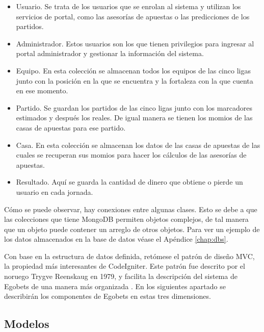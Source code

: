 	\begin{itemize}
		\item Usuario. Se trata de los usuarios que se enrolan al sistema y utilizan los servicios de portal, como las asesorías de apuestas o las predicciones de los partidos.
		\item Administrador. Estos usuarios son los que tienen privilegios para ingresar al portal administrador y gestionar la información del sistema.
		\item Equipo. En esta colección se almacenan todos los equipos de las cinco ligas junto con la posición en la que se encuentra  y la fortaleza con la que cuenta en ese momento.
		\item Partido. Se guardan los partidos de las cinco ligas junto con los marcadores estimados y después los reales. De igual manera se tienen los momios de las casas de apuestas para ese partido.
		\item Casa. En esta colección se almacenan los datos de las casas de apuestas de las cuales se recuperan sus momios para hacer los cálculos de las asesorías de apuestas.
		\item Resultado. Aquí se guarda la cantidad de dinero que obtiene o pierde un usuario en cada jornada.
	\end{itemize}
	Cómo se puede observar, hay conexiones entre algunas clases. Esto se debe a que las colecciones que tiene MongoDB permiten objetos complejos, de tal manera que un objeto puede contener un arreglo de otros objetos. Para ver un ejemplo de los datos almacenados en la base de datos véase el Apéndice \ref{chap:dbs}.

	Con base en la estructura de datos definida, retómese el patrón de diseño MVC, la propiedad más interesantes de CodeIgniter. Este patrón fue descrito por el noruego Trygve Reenskaug en 1979, y facilita la descripción del sistema de Egobets de una manera más organizada \cite{upton2007codeigniter} \cite{alfredo2005ingenieria}. En los siguientes apartado se describirán  los componentes de Egobets en estas tres dimensiones.


		 \subsection{Modelos}

